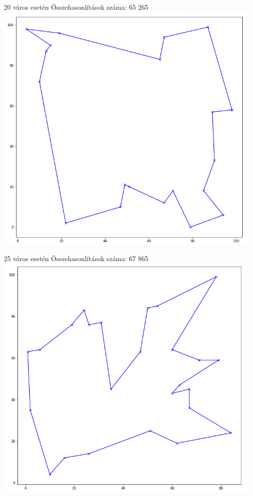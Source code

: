 20 város esetén
Összehasonlítások száma: 65 265
\includegraphics[scale=0.4]{images/20.png}

25 város esetén
Összehasonlítások száma: 67 865
\includegraphics[scale=0.4]{images/25.png}

